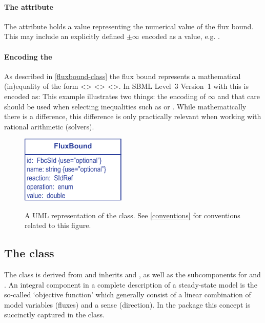 \paragraph{The  attribute}
The  attribute holds a  value representing the numerical value of the flux bound. This may include an explicitly defined $\pm\infty$ encoded as a value, e.g. .

\paragraph{Encoding the \FluxBound}
As described in \ref{fluxbound-class} the flux bound represents a mathematical (in)equality of the form <> <> <>. In SBML Level~3 Version~1 with \FBC this is encoded as:
%
%
This example illustrates two things: the encoding of $\infty$ and that care should be used when selecting inequalities such as  or . While mathematically there is a difference, this difference is only practically relevant when working with rational arithmetic (solvers).

\begin{figure}[h]
  \centering
  \includegraphics[width=5cm]{images/fbc_uml_fbnd.pdf}\\
  \caption{A UML representation of the \FBCPackage \FluxBound class. See \ref{conventions} for conventions related to this figure.}
  \label{fig:fbc_uml_fbnd}
\end{figure}


\subsection{The \FBC {} class}
\label{objective-class}
\label{listoffluxobjectives-class}


The \FBC \Objective class is derived from \SBML \SBase and inherits  and , as well as the subcomponents for \Annotation and \Notes. An integral component in a complete description of a steady-state model is the so-called `objective function' which generally consist of a linear combination of model variables (fluxes) and a sense (direction). In the \FBC package this concept is succinctly captured in the \Objective class.

